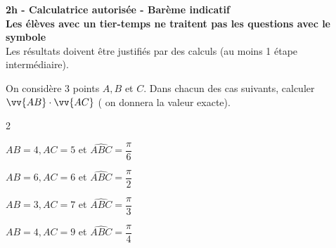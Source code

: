 \documentclass[12pt,a4paper]{article}  %
\begin{document}
\graphicspath{{../images/}}

\begin{center}

\end{center}


\begin{center}\textbf{2h - Calculatrice autorisée - Barème indicatif}\\
\textbf{Les élèves avec un tier-temps ne traitent pas les questions avec  le symbole }\\
Les résultats doivent être justifiés par des calculs (au moins 1 étape intermédiaire).
\end{center}

%

\vspace{-.3cm} 
On considère 3 points $A, B$ et $C$. Dans chacun des cas suivants, calculer $\vv{A B} \cdot \vv{A C}$ ( on donnera la valeur exacte).
\begin{multicols}{2}
\begin{enumMet}
    \item $A B=4, A C=5$ et $\widehat{A B C}=\dfrac{\pi}{6}$
    \item $A B=6, A C=6$ et $\widehat{A B C}=\dfrac{\pi}{2}$
    \item $A B=3, A C=7$ et $\widehat{A B C}=\dfrac{\pi}{3}$
    \item $A B=4, A C=9$ et $\widehat{A B C}=\dfrac{\pi}{4}$
\end{enumMet}
\end{multicols}
\end{document}
